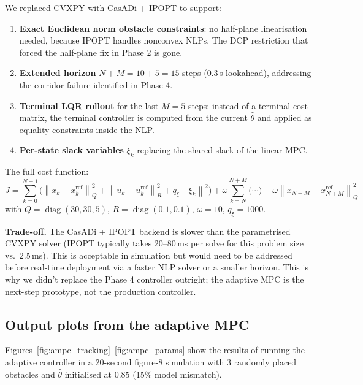 \documentclass[12pt,a4paper]{article}
\newcommand{\norm}[1]{\left\lVert#1\right\rVert}
\newcommand{\diag}{\operatorname{diag}}
\begin{document}
We replaced CVXPY with CasADi + IPOPT to support:
\begin{enumerate}[itemsep=2pt]
  \item \textbf{Exact Euclidean norm obstacle constraints}: no half-plane
    linearisation needed, because IPOPT handles nonconvex NLPs. The DCP
    restriction that forced the half-plane fix in Phase 2 is gone.
  \item \textbf{Extended horizon} $N + M = 10 + 5 = 15$ steps (0.3\,s
    lookahead), addressing the corridor failure identified in Phase 4.
  \item \textbf{Terminal LQR rollout} for the last $M=5$ steps: instead of
    a terminal cost matrix, the terminal controller is computed from the
    current $\hat{\theta}$ and applied as equality constraints inside the NLP.
  \item \textbf{Per-state slack variables} $\xi_k$ replacing the shared
    slack of the linear MPC.
\end{enumerate}

The full cost function:
\begin{equation}
  J = \sum_{k=0}^{N-1}\!\bigl(\norm{x_k-x^\text{ref}_k}_Q^2
  + \norm{u_k-u^\text{ref}_k}_R^2 + q_\xi\norm{\xi_k}^2\bigr)
  + \omega\sum_{k=N}^{N+M}\!\bigl(\cdots\bigr)
  + \omega\norm{x_{N+M}-x^\text{ref}_{N+M}}_Q^2
\end{equation}
with $Q=\diag(30,30,5)$, $R=\diag(0.1,0.1)$, $\omega=10$, $q_\xi=1000$.

\begin{insight}
\textbf{Trade-off.} The CasADi + IPOPT backend is slower than the
parametrised CVXPY solver (IPOPT typically takes 20--80\,ms per solve
for this problem size vs.\ 2.5\,ms). This is acceptable in simulation
but would need to be addressed before real-time deployment via a faster
NLP solver or a smaller horizon. This is why we didn't replace the Phase 4
controller outright; the adaptive MPC is the next-step prototype, not the
production controller.
\end{insight}

\subsection{Output plots from the adaptive MPC}

Figures~\ref{fig:ampc_tracking}--\ref{fig:ampc_params} show the results
of running the adaptive controller in a 20-second figure-8 simulation with
3 randomly placed obstacles and $\hat{\theta}$ initialised at 0.85 (15\%
model mismatch).
\end{document}
